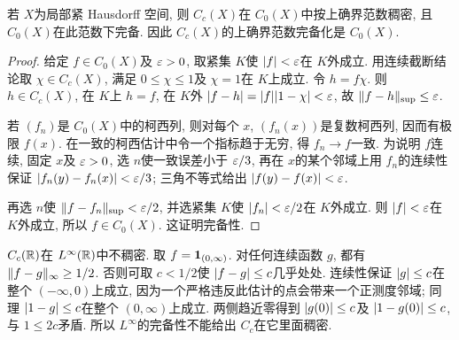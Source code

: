 \begin{theorem}\label{ra:c5:c0-completion}
若 $X$为局部紧 Hausdorff 空间, 则 $C_c(X)$在 $C_0(X)$中按上确界范数稠密, 且 $C_0(X)$在此范数下完备. 因此 $C_c(X)$的上确界范数完备化是 $C_0(X)$.
\end{theorem}
\begin{proof}
给定 $f\in C_0(X)$及 $\varepsilon>0$, 取紧集 $K$使 $\lvert f\rvert<\varepsilon$在 $K$外成立. 用连续截断结论取 $\chi\in C_c(X)$, 满足 $0\le\chi\le1$及 $\chi=1$在 $K$上成立. 令 $h=f\chi$. 则 $h\in C_c(X)$, 在 $K$上 $h=f$, 在 $K$外 $\lvert f-h\rvert=\lvert f\rvert\lvert 1-\chi\rvert<\varepsilon$, 故 $\lVert f-h\rVert_{\mathrm{sup}}\le\varepsilon$.

若 $(f_n)$是 $C_0(X)$中的柯西列, 则对每个 $x$, $(f_n(x))$是复数柯西列, 因而有极限 $f(x)$. 在一致的柯西估计中令一个指标趋于无穷, 得 $f_n\to f$一致. 为说明 $f$连续, 固定 $x$及 $\varepsilon>0$, 选 $n$使一致误差小于 $\varepsilon/3$, 再在 $x$的某个邻域上用 $f_n$的连续性保证 $\lvert f_n(y)-f_n(x)\rvert<\varepsilon/3$; 三角不等式给出 $\lvert f(y)-f(x)\rvert<\varepsilon$.

再选 $n$使 $\lVert f-f_n\rVert_{\mathrm{sup}}<\varepsilon/2$, 并选紧集 $K$使 $\lvert f_n\rvert<\varepsilon/2$在 $K$外成立. 则 $\lvert f\rvert<\varepsilon$在 $K$外成立, 所以 $f\in C_0(X)$. 这证明完备性.
\end{proof}

\begin{example}\label{ra:c5:linfty-not-density}
$C_c(\mathbb R)$在 $L^\infty(\mathbb R)$中不稠密. 取 $f=\mathbf 1_{(0,\infty)}$. 对任何连续函数 $g$, 都有 $\lVert f-g\rVert_\infty\ge1/2$. 否则可取 $c<1/2$使 $\lvert f-g\rvert\le c$几乎处处. 连续性保证 $\lvert g\rvert\le c$在整个 $(-\infty,0)$上成立, 因为一个严格违反此估计的点会带来一个正测度邻域; 同理 $\lvert 1-g\rvert\le c$在整个 $(0,\infty)$上成立. 两侧趋近零得到 $\lvert g(0)\rvert\le c$及 $\lvert 1-g(0)\rvert\le c$, 与 $1\le2c$矛盾. 所以 $L^\infty$的完备性不能给出 $C_c$在它里面稠密.
\end{example}

